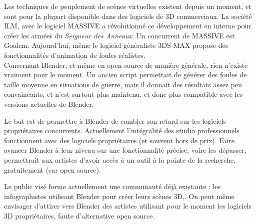 \documentclass[a4paper,12pt]{article}
\begin{document}
Les techniques de peuplement de scènes virtuelles existent depuis un moment, et sont pour la plupart disponible dans des logiciels de 3D commerciaux. La société ILM, avec le logiciel MASSIVE\cite{Massive} a révolutionné ce développement en interne pour créer les armées du \textit{Seigneur des Anneaux}. Un concurrent de MASSIVE est Goalem\cite{Golaem}. Aujourd'hui, même le logiciel généraliste 3DS MAX\cite{3dsmax} propose des fonctionnalités d'animation de foules réalistes. \\
Concernant Blender, et même en open source de manière générale, rien n'existe vraiment pour le moment. Un ancien script permettait de générer des foules de taille moyenne en situations de guerre, mais il donnait des résultats assez peu convaincants, et n'est surtout plus maintenu, et donc plus compatible avec les versions actuelles de Blender.

Le but est de permettre à Blender de combler son retard sur les logiciels propriétaires concurrents. Actuellement l'intégralité des studio professionnels fonctionnent avec des logiciels propriétaires (et souvent hors de prix). Faire avancer Blender à leur niveau sur une fonctionnalité précise, voire les dépasser, permettrait aux artistes d'avoir accès à un outil à la pointe de la recherche, gratuitement (car open source).

Le public visé forme actuellement une communauté déjà existante : les infographistes utilisant Blender pour créer leurs scènes 3D,. On peut même envisager d'attirer vers Blender des artistes utilisant pour le moment les logiciels 3D propriétaires, faute d'alternative open source.
\end{document}
